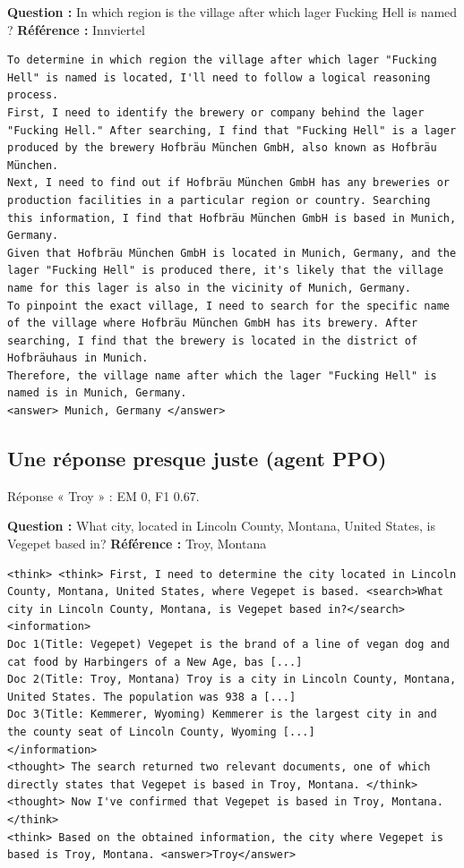\noindent\textbf{Question :} In which region is the village after which lager Fucking Hell is named ? \quad \textbf{Référence :} Innviertel
\begin{Verbatim}[breaklines=true, breakanywhere=true, fontsize=\scriptsize, frame=single]
To determine in which region the village after which lager "Fucking Hell" is named is located, I'll need to follow a logical reasoning process.
First, I need to identify the brewery or company behind the lager "Fucking Hell." After searching, I find that "Fucking Hell" is a lager produced by the brewery Hofbräu München GmbH, also known as Hofbräu München.
Next, I need to find out if Hofbräu München GmbH has any breweries or production facilities in a particular region or country. Searching this information, I find that Hofbräu München GmbH is based in Munich, Germany.
Given that Hofbräu München GmbH is located in Munich, Germany, and the lager "Fucking Hell" is produced there, it's likely that the village name for this lager is also in the vicinity of Munich, Germany. 
To pinpoint the exact village, I need to search for the specific name of the village where Hofbräu München GmbH has its brewery. After searching, I find that the brewery is located in the district of Hofbräuhaus in Munich.
Therefore, the village name after which the lager "Fucking Hell" is named is in Munich, Germany.
<answer> Munich, Germany </answer>
\end{Verbatim}

\subsection*{Une réponse presque juste (agent PPO)}
Réponse « Troy » : EM 0, F1 0.67.

\noindent\textbf{Question :} What city, located in Lincoln County, Montana, United States, is Vegepet based in? \quad \textbf{Référence :} Troy, Montana
\begin{Verbatim}[breaklines=true, breakanywhere=true, fontsize=\scriptsize, frame=single]
<think> <think> First, I need to determine the city located in Lincoln County, Montana, United States, where Vegepet is based. <search>What city in Lincoln County, Montana, is Vegepet based in?</search>
<information>
Doc 1(Title: Vegepet) Vegepet is the brand of a line of vegan dog and cat food by Harbingers of a New Age, bas [...]
Doc 2(Title: Troy, Montana) Troy is a city in Lincoln County, Montana, United States. The population was 938 a [...]
Doc 3(Title: Kemmerer, Wyoming) Kemmerer is the largest city in and the county seat of Lincoln County, Wyoming [...]
</information>
<thought> The search returned two relevant documents, one of which directly states that Vegepet is based in Troy, Montana. </think>
<thought> Now I've confirmed that Vegepet is based in Troy, Montana. </think>
<think> Based on the obtained information, the city where Vegepet is based is Troy, Montana. <answer>Troy</answer>
\end{Verbatim}

